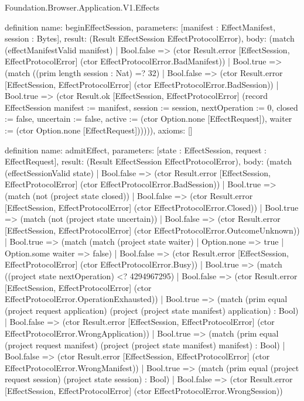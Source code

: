 \begin{lexlean}{Foundation.Browser.Application.V1.Effects}
\begin{semanticmodule}
definition{
  name: beginEffectSession,
  parameters: [manifest : EffectManifest, session : Bytes],
  result: (Result EffectSession EffectProtocolError),
  body: (match (effectManifestValid manifest)
    | Bool.false => (ctor Result.error [EffectSession, EffectProtocolError] (ctor EffectProtocolError.BadManifest))
    | Bool.true => (match ((prim length session : Nat) =? 32)
      | Bool.false => (ctor Result.error [EffectSession, EffectProtocolError] (ctor EffectProtocolError.BadSession))
      | Bool.true => (ctor Result.ok [EffectSession, EffectProtocolError] (record EffectSession {manifest := manifest, session := session, nextOperation := 0, closed := false, uncertain := false, active := (ctor Option.none [EffectRequest]), waiter := (ctor Option.none [EffectRequest])})))),
  axioms: []
}

definition{
  name: admitEffect,
  parameters: [state : EffectSession, request : EffectRequest],
  result: (Result EffectSession EffectProtocolError),
  body: (match (effectSessionValid state)
    | Bool.false => (ctor Result.error [EffectSession, EffectProtocolError] (ctor EffectProtocolError.BadSession))
    | Bool.true => (match (not (project state closed))
      | Bool.false => (ctor Result.error [EffectSession, EffectProtocolError] (ctor EffectProtocolError.Closed))
      | Bool.true => (match (not (project state uncertain))
        | Bool.false => (ctor Result.error [EffectSession, EffectProtocolError] (ctor EffectProtocolError.OutcomeUnknown))
        | Bool.true => (match (match (project state waiter)
            | Option.none => true
            | Option.some waiter => false)
          | Bool.false => (ctor Result.error [EffectSession, EffectProtocolError] (ctor EffectProtocolError.Busy))
          | Bool.true => (match ((project state nextOperation) <? 4294967295)
            | Bool.false => (ctor Result.error [EffectSession, EffectProtocolError] (ctor EffectProtocolError.OperationExhausted))
            | Bool.true => (match (prim equal (project request application) (project (project state manifest) application) : Bool)
              | Bool.false => (ctor Result.error [EffectSession, EffectProtocolError] (ctor EffectProtocolError.WrongApplication))
              | Bool.true => (match (prim equal (project request manifest) (project (project state manifest) manifest) : Bool)
                | Bool.false => (ctor Result.error [EffectSession, EffectProtocolError] (ctor EffectProtocolError.WrongManifest))
                | Bool.true => (match (prim equal (project request session) (project state session) : Bool)
                  | Bool.false => (ctor Result.error [EffectSession, EffectProtocolError] (ctor EffectProtocolError.WrongSession))
}
\end{semanticmodule}
\end{lexlean}
